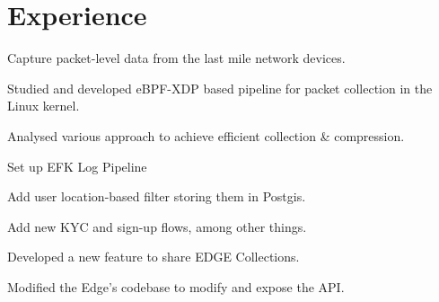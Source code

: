 \documentclass[letterpaper]{deedy-resume} %
\begin{document}
\begin{minipage}[t]{0.66\textwidth} %


\section{Experience}

\vspace{\topsep} %
\begin{tightitemize}
\item Capture packet-level data from the last mile network devices.
\item Studied and developed eBPF-XDP based pipeline for packet collection in the Linux kernel.
\item Analysed various approach to achieve efficient collection \& compression.
\end{tightitemize}

\sectionspace %


\begin{tightitemize}
\item Set up EFK Log Pipeline
\item Add user location-based filter storing them in Postgis.
\item Add new KYC and sign-up flows, among other things.
\end{tightitemize}

\sectionspace %


\begin{tightitemize}
\item Developed a new feature to share EDGE Collections.
\item Modified the Edge's codebase to modify and expose the API.
\end{tightitemize}


\end{minipage}
\end{document}
